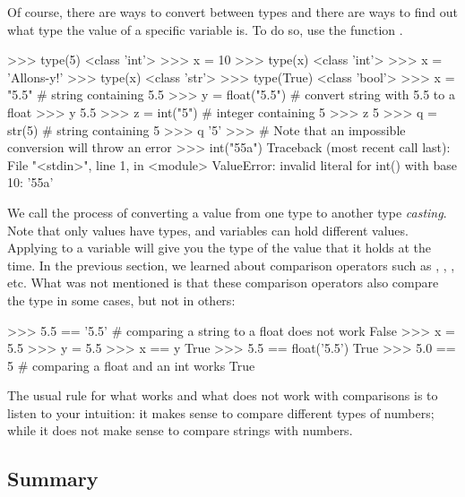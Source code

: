 \documentclass[11pt]{cselabheader}
\begin{document}
Of course, there are ways to convert between types and there are ways to find
out what type the value of a specific variable is. To do so, use the function
.
\begin{pyconcode}
>>> type(5)
<class 'int'>
>>> x = 10
>>> type(x)
<class 'int'>
>>> x = 'Allons-y!'
>>> type(x)
<class 'str'>
>>> type(True)
<class 'bool'>
>>> x = "5.5" # string containing 5.5
>>> y = float("5.5") # convert string with 5.5 to a float
>>> y
5.5
>>> z = int("5") # integer containing 5
>>> z
5
>>> q = str(5) # string containing 5
>>> q
'5'
>>> # Note that an impossible conversion will throw an error
>>> int("55a")
Traceback (most recent call last):
  File "<stdin>", line 1, in <module>
ValueError: invalid literal for int() with base 10: '55a'
\end{pyconcode}

We call the process of converting a value from one type to another type
\emph{casting}. Note that only values have types, and variables can hold
different values.  Applying  to a variable will give you
the type of the value that it holds at the time. In the previous section, we
learned about comparison operators such as \pythoninline{!=}, \pythoninline{<},
\pythoninline{>}, etc. What was not mentioned is that these comparison operators
also compare the type in some cases, but not in others:
\begin{pyconcode}
>>> 5.5 == '5.5' # comparing a string to a float does not work
False
>>> x = 5.5
>>> y = 5.5
>>> x == y
True
>>> 5.5 == float('5.5')
True
>>> 5.0 == 5 # comparing a float and an int works
True
\end{pyconcode}

The usual rule for what works and what does not work with comparisons is to
listen to your intuition: it makes sense to compare different types of numbers;
while it does not make sense to compare strings with numbers.

\subsection{Summary}
\end{document}
